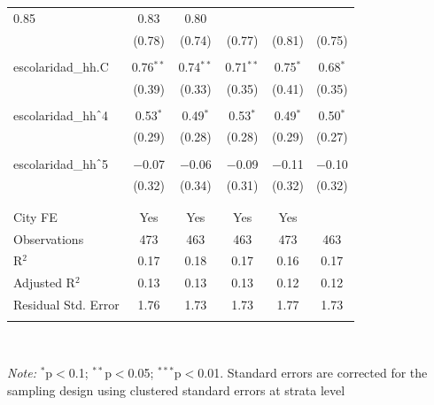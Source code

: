 \begin{table}[H]
\begin{tabularx}{0.9\textwidth}{@{\extracolsep{-7pt}}lccccc}
0.85 & 0.83 & 0.80 \\    & (0.78) & (0.74) & (0.77) & (0.81) & (0.75) \\    & & & & & \\   escolaridad\_hh.C & 0.76$^{**}$ & 0.74$^{**}$ & 0.71$^{**}$ & 0.75$^{*}$ & 0.68$^{*}$ \\    & (0.39) & (0.33) & (0.35) & (0.41) & (0.35) \\    & & & & & \\   escolaridad\_hh$\hat{\mkern6mu}$4 & 0.53$^{*}$ & 0.49$^{*}$ & 0.53$^{*}$ & 0.49$^{*}$ & 0.50$^{*}$ \\    & (0.29) & (0.28) & (0.28) & (0.29) & (0.27) \\    & & & & & \\   escolaridad\_hh$\hat{\mkern6mu}$5 & $-$0.07 & $-$0.06 & $-$0.09 & $-$0.11 & $-$0.10 \\    & (0.32) & (0.34) & (0.31) & (0.32) & (0.32) \\    & & & & & \\  \hline \\[-1.8ex]  City FE & Yes & Yes & Yes & Yes &  \\  Observations & 473 & 463 & 463 & 473 & 463 \\  R$^{2}$ & 0.17 & 0.18 & 0.17 & 0.16 & 0.17 \\  Adjusted R$^{2}$ & 0.13 & 0.13 & 0.13 & 0.12 & 0.12 \\  Residual Std. Error & 1.76 & 1.73 & 1.73 & 1.77 & 1.73 \\  \hline  \hline \\[-1.8ex]  \end{tabularx} \\ \parbox[]{\textwidth}{\textit{Note:} $^{*}$p$<$0.1; $^{**}$p$<$0.05; $^{***}$p$<$0.01. Standard errors are corrected for the sampling design using clustered standard errors at strata level }  \end{table} 